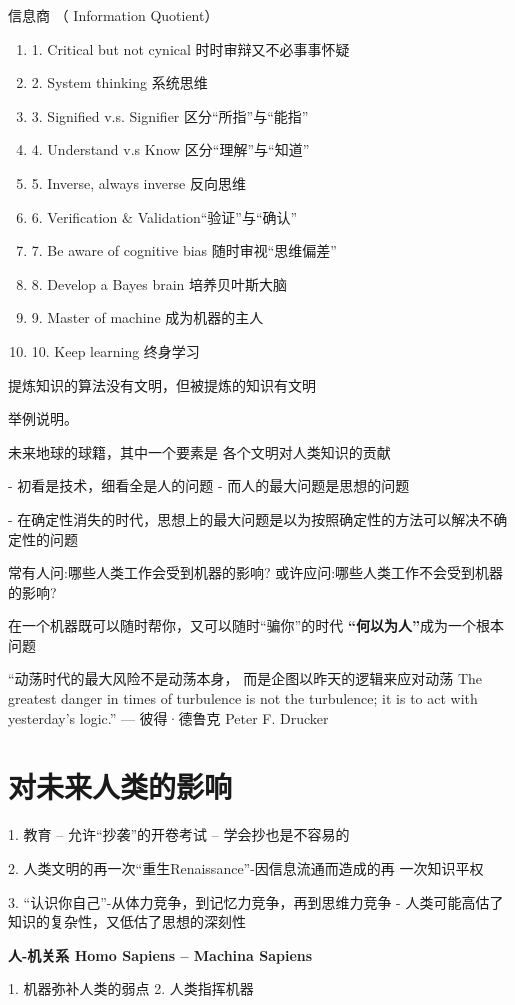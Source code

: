 信息商 （ Information Quotient）
\begin{enumerate}
\item 1. Critical but not cynical 时时审辩又不必事事怀疑
\item 2. System thinking 系统思维
\item 3. Signified v.s. Signifier 区分“所指”与“能指”
\item 4. Understand v.s Know 区分“理解”与“知道”
\item 5. Inverse, always inverse 反向思维
\item 6. Verification $\&$ Validation“验证”与“确认”
\item 7. Be aware of cognitive bias 随时审视“思维偏差”
\item 8. Develop a Bayes brain 培养贝叶斯大脑
\item 9. Master of machine 成为机器的主人
\item 10. Keep learning 终身学习
\end{enumerate}

提炼知识的算法没有文明，但被提炼的知识有文明

举例说明。 

未来地球的球籍，其中一个要素是
  各个文明对人类知识的贡献
  
- 初看是技术，细看全是人的问题 - 而人的最大问题是思想的问题

- 在确定性消失的时代，思想上的最大问题是以为按照确定性的方法可以解决不确定性的问题


常有人问:哪些人类工作会受到机器的影响? 或许应问:哪些人类工作不会受到机器的影响?

在一个机器既可以随时帮你，又可以随时“骗你”的时代 {\bf “何以为人”}成为一个根本问题

“动荡时代的最大风险不是动荡本身， 而是企图以昨天的逻辑来应对动荡
The greatest danger in times of turbulence is not the turbulence; it is to act with yesterday’s logic.”
— 彼得·德鲁克 Peter F. Drucker

 \section{对未来人类的影响}
1. 教育 – 允许“抄袭”的开卷考试 – 学会抄也是不容易的

2. 人类文明的再一次“重生Renaissance”-因信息流通而造成的再 一次知识平权

3. “认识你自己”-从体力竞争，到记忆力竞争，再到思维力竞争 - 人类可能高估了知识的复杂性，又低估了思想的深刻性


{\bf 人-机关系 Homo Sapiens – Machina Sapiens}

1. 机器弥补人类的弱点 
2. 人类指挥机器





\nocite{*}
\printbibliography[heading=bibintoc, title=\ebibname]
\appendix

\newpage